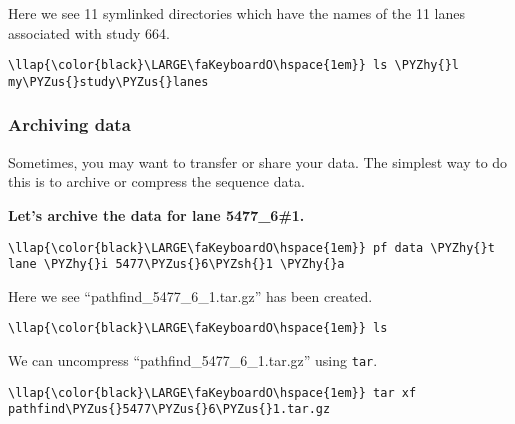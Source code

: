 \documentclass[11pt]{article}
\def\PYZus{\char`\_}
\def\PYZsh{\char`\#}
\def\PYZhy{\char`\-}
\begin{document}
    Here we see 11 symlinked directories which have the names of the 11
lanes associated with study 664.

\begin{terminalinput}
\begin{Verbatim}[commandchars=\\\{\}]
\llap{\color{black}\LARGE\faKeyboardO\hspace{1em}} ls \PYZhy{}l my\PYZus{}study\PYZus{}lanes
\end{Verbatim}
\end{terminalinput}

    \hypertarget{archiving-data}{%
\subsubsection{Archiving data}\label{archiving-data}}

Sometimes, you may want to transfer or share your data. The simplest way
to do this is to archive or compress the sequence data.

\textbf{Let's archive the data for lane 5477\_6\#1.}

\begin{terminalinput}
\begin{Verbatim}[commandchars=\\\{\}]
\llap{\color{black}\LARGE\faKeyboardO\hspace{1em}} pf data \PYZhy{}t lane \PYZhy{}i 5477\PYZus{}6\PYZsh{}1 \PYZhy{}a
\end{Verbatim}
\end{terminalinput}

    Here we see ``pathfind\_5477\_6\_1.tar.gz'' has been created.

\begin{terminalinput}
\begin{Verbatim}[commandchars=\\\{\}]
\llap{\color{black}\LARGE\faKeyboardO\hspace{1em}} ls
\end{Verbatim}
\end{terminalinput}

    We can uncompress ``pathfind\_5477\_6\_1.tar.gz'' using \texttt{tar}.

\begin{terminalinput}
\begin{Verbatim}[commandchars=\\\{\}]
\llap{\color{black}\LARGE\faKeyboardO\hspace{1em}} tar xf pathfind\PYZus{}5477\PYZus{}6\PYZus{}1.tar.gz
\end{Verbatim}
\end{terminalinput}
\end{document}
